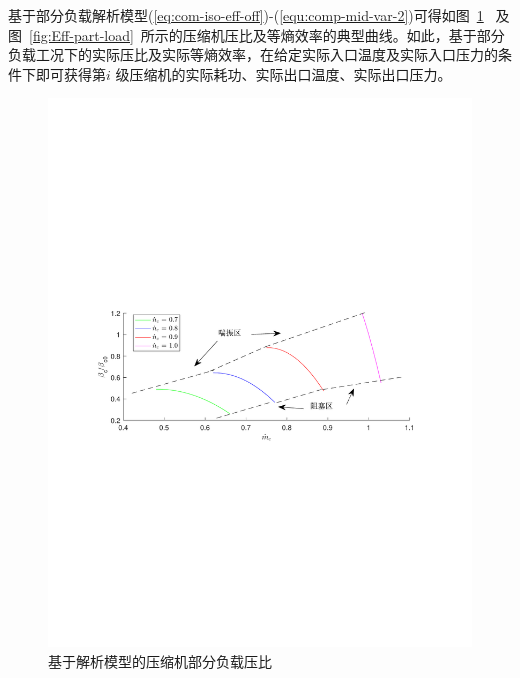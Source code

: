 基于部分负载解析模型(\ref{eq:com-iso-eff-off})-(\ref{equ:comp-mid-var-2})可得如图~\ref{fig:Comp-Ratio-off-design}~ 及图~\ref{fig:Eff-part-load}~所示的压缩机压比及等熵效率的典型曲线。如此，基于部分负载工况下的实际压比及实际等熵效率，在给定实际入口温度及实际入口压力的条件下即可获得第$i$ 级压缩机的实际耗功、实际出口温度、实际出口压力。

\begin{figure}[H] %
  \centering
  \includegraphics[scale=0.70]{figures/Chap2-2-Comp-Ratio-off-design.pdf}
  \caption{基于解析模型的压缩机部分负载压比}
  \label{fig:Comp-Ratio-off-design}
\end{figure}


